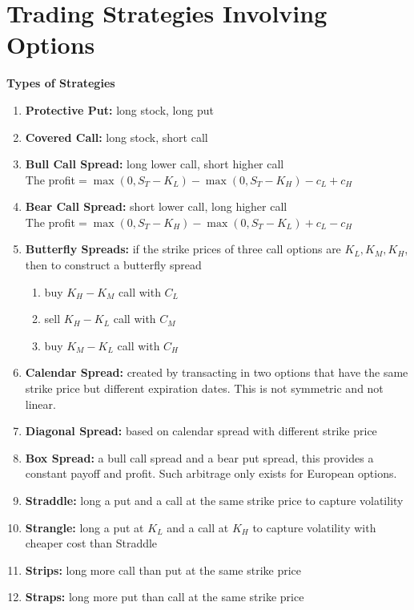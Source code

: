 \documentclass[11pt,fleqn]{report} %
\numberwithin{equation}{section} %
\numberwithin{figure}{section} %
\numberwithin{table}{section} %
\begin{document}
\chapter{Trading Strategies Involving Options}
\begin{definition}\textbf{Types of Strategies}
\begin{enumerate}
    \item \textbf{Protective Put:} long stock, long put
    \item \textbf{Covered Call:} long stock, short call
    \item \textbf{Bull Call Spread:} long lower call, short higher call\\
    The profit$=\max(0,S_T-K_L)-\max(0,S_T-K_H)-c_{L}+c_{H}$
    \item \textbf{Bear Call Spread:} short lower call, long higher call\\
    The profit$=\max(0,S_T-K_H)-\max(0,S_T-K_L)+c_{L}-c_{H}$
    \item \textbf{Butterfly Spreads:} if the strike prices of three call options are $K_L,K_M,K_H$, then to construct a butterfly spread
    \begin{enumerate}
        \item buy ${K_H-K_M}$ call with $C_L$
        \item sell ${K_H-K_L}$ call with $C_M$
        \item buy ${K_M-K_L}$ call with $C_H$
    \end{enumerate}
    \item \textbf{Calendar Spread:} created by transacting in two options that have the same strike price but different expiration dates. This is not symmetric and not linear.
    \item \textbf{Diagonal Spread:} based on calendar spread with different strike price
    \item \textbf{Box Spread:} a bull call spread and a bear put spread, this provides a constant payoff and profit. Such arbitrage only exists for European options.
    \item \textbf{Straddle:} long a put and a call at the same strike price to capture volatility
    \item \textbf{Strangle:} long a put at $K_L$ and a call at $K_H$ to capture volatility with cheaper cost than Straddle
    \item \textbf{Strips:} long more call than put at the same strike price
    \item \textbf{Straps:} long more put than call at the same strike price
\end{enumerate}
\end{definition}
\end{document}
